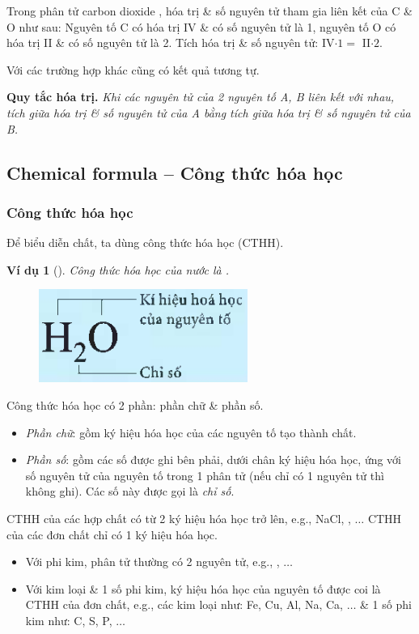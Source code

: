 \documentclass{article}
\newtheorem{vidu}{Ví dụ}
\begin{document}
Trong phân tử carbon dioxide , hóa trị \& số nguyên tử tham gia liên kết của C \& O như sau: Nguyên tố C có hóa trị IV \& có số nguyên tử là 1, nguyên tố O có hóa trị II \& có số nguyên tử là 2. Tích hóa trị \& số nguyên tử: IV$\cdot1 =$ II$\cdot2$.

Với các trường hợp khác cũng có kết quả tương tự.

\textbf{Quy tắc hóa trị.} \textit{Khi các nguyên tử của 2 nguyên tố A, B liên kết với nhau, tích giữa hóa trị \& số nguyên tử của A bằng tích giữa hóa trị \& số nguyên tử của B.}

\subsection{Chemical formula -- Công thức hóa học}

\subsubsection{Công thức hóa học}
Để biểu diễn chất, ta dùng công thức hóa học (CTHH).

\begin{vidu}[]
	Công thức hóa học của nước là \emph{}.
	\begin{figure}[H]
		\centering
		\includegraphics[scale=0.3]{CTHH_H2O}
	\end{figure}
\end{vidu}
Công thức hóa học có 2 phần: phần chữ \& phần số.
\begin{itemize}
	\item \textit{Phần chữ}: gồm ký hiệu hóa học của các nguyên tố tạo thành chất.
	\item \textit{Phần số}: gồm các số được ghi bên phải, dưới chân ký hiệu hóa học, ứng với số nguyên tử của nguyên tố trong 1 phân tử (nếu chỉ có 1 nguyên tử thì không ghi). Các số này được gọi là \textit{chỉ số}.
\end{itemize}
CTHH của các hợp chất có từ 2 ký hiệu hóa học trở lên, e.g., NaCl, , $\ldots$ CTHH của các đơn chất chỉ có 1 ký hiệu hóa học.
\begin{itemize}
	\item Với phi kim, phân tử thường có 2 nguyên tử, e.g., , $\ldots$
	\item Với kim loại \& 1 số phi kim, ký hiệu hóa học của nguyên tố được coi là CTHH của đơn chất, e.g., các kim loại như: Fe, Cu, Al, Na, Ca, $\ldots$ \& 1 số phi kim như: C, S, P, $\ldots$
\end{itemize}
\end{document}
